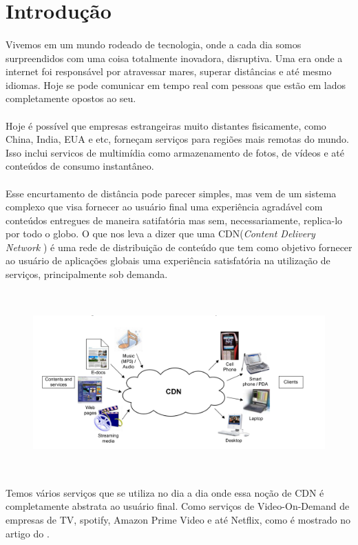 \section{Introdu\c{c}\~ao}

\paragraph{}
Vivemos em um mundo rodeado de tecnologia, onde a cada dia somos surpreendidos com uma coisa totalmente inovadora, disruptiva. Uma era onde a internet foi respons\'avel por atravessar mares, superar dist\^ancias e at\'e mesmo idiomas. Hoje se pode comunicar em tempo real com pessoas que est\~ao em lados completamente opostos ao seu. 
\paragraph{}
Hoje \'e poss\'ivel que empresas estrangeiras muito distantes fisicamente, como China, India, EUA e etc, forne\c{c}am servi\c{c}os para regi\~oes mais remotas do mundo. Isso inclui servi{c}os de multim\'idia como armazenamento de fotos, de v\'ideos e at\'e conte\'udos de consumo instant\^aneo.
\paragraph{}
Esse encurtamento de dist\^ancia pode parecer simples, mas vem de um sistema complexo que visa fornecer ao usu\'ario final uma experi\^encia agrad\'avel com conte\'udos entregues de maneira satifat\'oria mas sem, necessariamente, replica-lo por todo o globo. O que nos leva a dizer que uma CDN(\textit{Content Delivery Network} ) \'e uma rede de distribui\c{c}\~ao de conte\'udo que tem como objetivo fornecer ao usu\'ario de aplica\c{c}\~oes globais uma experi\^encia satisfat\'oria na utiliza\c{c}\~ao de servi\c{c}os, principalmente sob demanda.
\begin{figure}[H]
\includegraphics[height=7cm]{Figuras/contextualizacao.png} 
\label{figura:contextualizacao} 
\end{figure}
Temos v\'arios servi\c{c}os que se utiliza no dia a dia onde essa no\c{c}\~ao de CDN \'e completamente abstrata ao usu\'ario final. Como servi\c{c}os de Video-On-Demand de empresas de TV, spotify, Amazon Prime Video e at\'e Netflix, como \'e mostrado no artigo do \cite{adhikari2012unreeling}.
